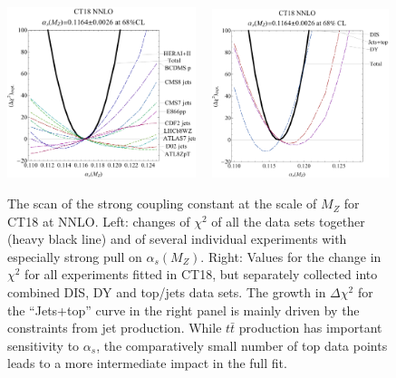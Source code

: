 \begin{figure}[tbp]
\centering
\includegraphics[width=0.49\textwidth]{./fig/alphas_scanTct18_pjb05a.pdf} \ \
\includegraphics[width=0.46\textwidth]{./fig/alphas_scanTct18_pjb05a2.pdf}
\caption{The scan of the strong coupling constant at the scale of $M_Z$ for CT18 at NNLO. Left: changes of $\chi^2$ of all the data sets together
    (heavy black line) and of several individual experiments with especially strong pull on $\alpha_s(M_Z)$. Right: Values for the change in $\chi^2$ for all experiments
    fitted in CT18, but separately collected into combined DIS, DY and top/jets data sets. The growth in $\Delta \chi^2$ for the ``Jets+top'' curve in the right panel
    is mainly driven by the constraints from jet production. While $t\bar{t}$ production has important sensitivity to $\alpha_s$, the comparatively
    small number of top data points leads to a more intermediate impact in the full fit.
	}
\label{fig:lm_alphas}
\end{figure}

